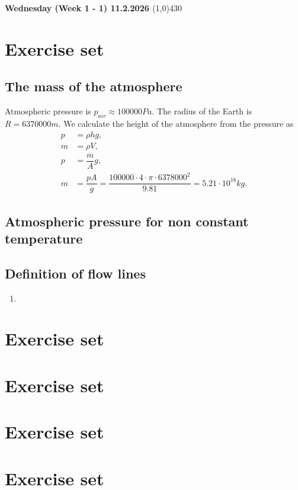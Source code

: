 \documentclass{article}
\begin{document}
\begin{center}
 \LARGE{\bfseries{ Wednesday (Week 1 - 1) 11.2.2026 }}
 \line(1,0){430}
\end{center}

\section{Exercise set}
    \subsection{The mass of the atmosphere}
        Atmospheric pressure is $p_{air} \approx 100000Pa$. The radius of the Earth is $R = 6370000m$. We calculate the height of the atmosphere from the pressure as
        \begin{align*}
            p &= \rho hg,\\
            m &= \rho V,\\
            p &= \dfrac{m}{A}g,\\
            m &= \dfrac{pA}{g} = \dfrac{100000 \cdot 4 \cdot \pi \cdot 6378000^2}{9.81} = 5.21 \cdot 10^{18}kg.
        \end{align*}
        
    \subsection{Atmospheric pressure for non constant temperature}

    \subsection{Definition of flow lines}
    \begin{enumerate}[label=\alph*]
        \item 
    \end{enumerate}

    \section{Exercise set}
    \section{Exercise set}
    \section{Exercise set}
    \section{Exercise set}
\end{document}
